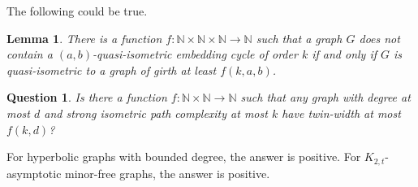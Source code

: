\documentclass[a4paper]{article}
\newtheorem{Question}{Question}
\newtheorem{lemma}{Lemma}
\newtheorem{definition}{Definition}
\begin{document}
 The following could be true.
 
 \begin{lemma}\label{lem:cycle}
 	There is a function $f\colon \mathbb{N}\times \mathbb{N} \times \mathbb{N} \rightarrow \mathbb{N}$ such that a graph $G$  does not contain a $(a,b)$-quasi-isometric embedding cycle of order $k$ if and only if $G$ is quasi-isometric to a graph of girth at least $f(k,a,b)$.
 \end{lemma}


 
 
 
% 
% 
% 
 
 \begin{Question}
 	Is there a function $f\colon \mathbb{N}\times \mathbb{N} \rightarrow \mathbb{N}$ such that any graph with degree at most $d$ and strong isometric path complexity at most $k$ have twin-width at most $f(k,d)$?
 \end{Question} 
 
For hyperbolic graphs with bounded degree, the answer is positive. For $K_{2,t}$-asymptotic minor-free graphs, the answer is positive. 
\end{document}
